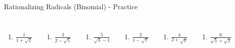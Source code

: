 \documentclass[aspectratio=169]{beamer}
\begin{document}
\begin{frame}{Rationalizing Radicals (Binomial) - Practice}
\begin{tcolorbox}[colback=lightgray,colframe=accent,title=Practice Problems]
\footnotesize
\begin{columns}[T]
\begin{enumerate}[label=4\textbf{a})]
  \item $\frac{1}{1+\sqrt{2}}$
\end{enumerate}
\begin{enumerate}[label=4\textbf{b})]
  \item $\frac{3}{2-\sqrt{5}}$
\end{enumerate}
\begin{enumerate}[label=4\textbf{c})]
  \item $\frac{5}{\sqrt{3}-1}$
\end{enumerate}
\begin{enumerate}[label=4\textbf{d})]
  \item $\frac{2}{1-\sqrt{7}}$
\end{enumerate}
\begin{enumerate}[label=4\textbf{e})]
  \item $\frac{4}{2+\sqrt{y}}$
\end{enumerate}
\begin{enumerate}[label=4\textbf{f})]
  \item $\frac{6}{\sqrt{5}+\sqrt{2}}$
\end{enumerate}
\end{columns}
\end{tcolorbox}
\end{frame}
\end{document}
